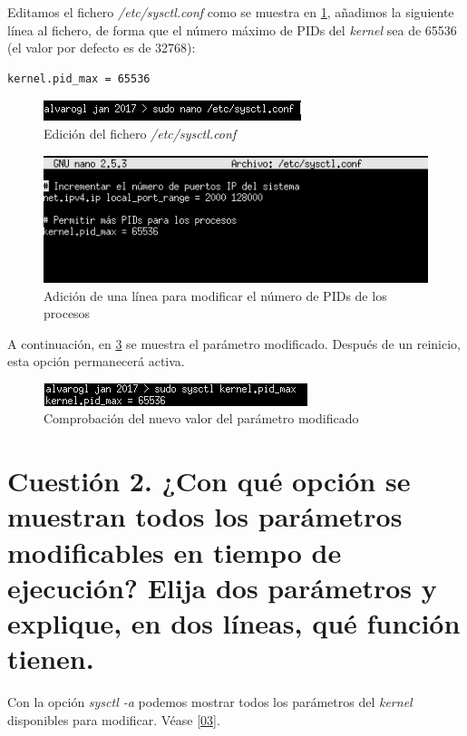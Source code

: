 Editamos el fichero \textit{/etc/sysctl.conf} como se muestra en \ref{00}, añadimos la siguiente línea al fichero, de forma que el número máximo de PIDs del \textit{kernel} sea de 65536 (el valor por defecto es de 32768):

\begin{verbatim}
kernel.pid_max = 65536
\end{verbatim}

\begin{figure}[H]
	\centering
	\includegraphics[scale=0.6]{00.png}
	\caption{Edición del fichero \textit{/etc/sysctl.conf}} \label{00}
\end{figure}

\begin{figure}[H]
	\centering
	\includegraphics[scale=0.6]{01.png}
	\caption{Adición de una línea para modificar el número de PIDs de los procesos} \label{01}
\end{figure}

A continuación, en \ref{02} se muestra el parámetro modificado. Después de un reinicio, esta opción permanecerá activa.

\begin{figure}[H]
	\centering
	\includegraphics[scale=0.6]{02.png}
	\caption{Comprobación del nuevo valor del parámetro modificado} \label{02}
\end{figure}

\section{Cuestión 2. ¿Con qué opción se muestran todos los parámetros modificables en tiempo de ejecución? Elija dos parámetros y explique, en dos líneas, qué función tienen.}

Con la opción \textit{sysctl -a} podemos mostrar todos los parámetros del \textit{kernel} disponibles para modificar. Véase \ref{03}.

